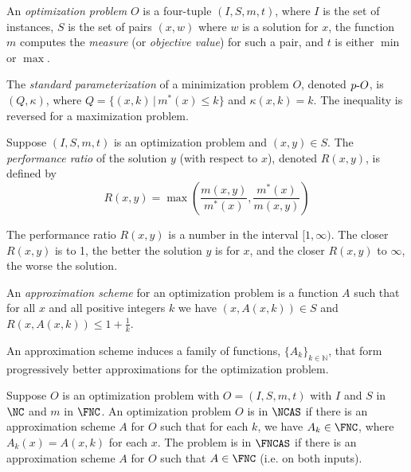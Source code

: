 \documentclass{article}
\newcommand{\dash}{\textnormal{-}}
\begin{document}
\begin{definition}
  An \emph{optimization problem} $O$ is a four-tuple $(I, S, m, t)$, where $I$ is the set of instances, $S$ is the set of pairs $(x, w)$ where $w$ is a solution for $x$, the function $m$ computes the \emph{measure} (or \emph{objective value}) for such a pair, and $t$ is either $\min$ or $\max$.
\end{definition}

\begin{definition}
  The \emph{standard parameterization} of a minimization problem $O$, denoted $p\dash{O}$, is $(Q, \kappa)$, where $Q = \{ (x, k) \, | \, m^*(x) \leq k \}$ and $\kappa(x, k) = k$.
  The inequality is reversed for a maximization problem.
\end{definition}

\begin{definition}
  Suppose $(I, S, m, t)$ is an optimization problem and $(x, y) \in S$.
  The \emph{performance ratio} of the solution $y$ (with respect to $x$), denoted $R(x, y)$, is defined by
  \[
  R(x, y) = \max \left(\frac{m(x, y)}{m^*(x)}, \frac{m^*(x)}{m(x, y)}\right)
  \]
\end{definition}

The performance ratio $R(x, y)$ is a number in the interval $[1, \infty)$.
The closer $R(x, y)$ is to 1, the better the solution $y$ is for $x$, and the closer $R(x, y)$ to $\infty$, the worse the solution.

\begin{definition}
  An \emph{approximation scheme} for an optimization problem is a function $A$ such that for all $x$ and all positive integers $k$ we have $(x, A(x, k)) \in S$ and $R(x, A(x, k)) \leq 1 + \frac{1}{k}$.
\end{definition}

An approximation scheme induces a family of functions, $\{A_k\}_{k \in \mathbb{N}}$, that form progressively better approximations for the optimization problem.


\begin{definition}
  Suppose $O$ is an optimization problem with $O = (I, S, m, t)$ with $I$ and $S$ in $\NC$ and $m$ in $\FNC$.
  An optimization problem $O$ is in $\NCAS$ if there is an approximation scheme $A$ for $O$ such that for each $k$, we have $A_k \in \FNC$, where $A_k(x) = A(x, k)$ for each $x$.
  The problem is in $\FNCAS$ if there is an approximation scheme $A$ for $O$ such that $A \in \FNC$ (i.e. on both inputs).
\end{definition}
\end{document}
